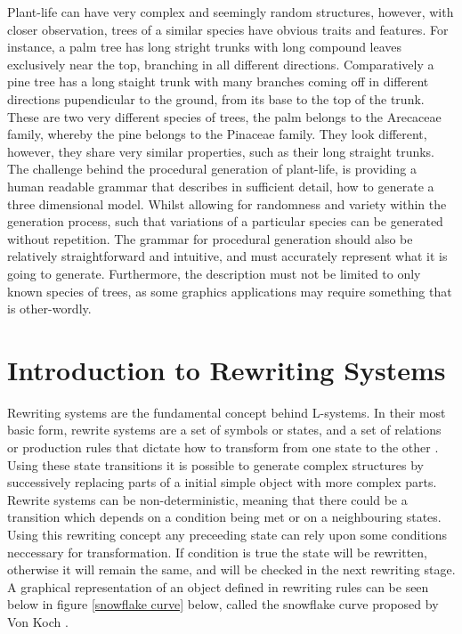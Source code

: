 Plant-life can have very complex and seemingly random structures, however, with closer observation, trees of a similar species have obvious traits and features. For instance, a palm tree has long stright trunks with long compound leaves exclusively near the top, branching in all different directions. Comparatively a pine tree has a long staight trunk with many branches coming off in different directions pupendicular to the ground, from its base to the top of the trunk. These are two very different species of trees, the palm  belongs to the Arecaceae family, whereby the pine belongs to the Pinaceae family. They look different, however, they share very similar properties, such as their long straight trunks. The challenge behind the  procedural generation of plant-life, is providing a human readable grammar that describes in sufficient detail, how to generate a three dimensional model. Whilst allowing for randomness and variety within the generation process, such that variations of a particular species can be generated without repetition. The  grammar for procedural generation should also be relatively straightforward and intuitive, and must accurately represent what it is going to generate. Furthermore, the description must not be limited to only known species of trees, as some graphics applications may require something that is other-wordly.

\section{Introduction to Rewriting Systems}

Rewriting systems are the fundamental concept behind L-systems. In their most basic form, rewrite systems are a set of symbols or states, and a set of relations or production rules that dictate how to transform from one state to the other \cite{prusinkiewicz2012algorithmic}. Using these state transitions it is possible to generate complex structures by successively replacing parts of a initial simple object with more complex parts. Rewrite systems can be non-deterministic, meaning that there could be a transition which depends on a condition being met or on a neighbouring states. Using this rewriting concept any preceeding state can rely upon some conditions neccessary for transformation. If condition is true the state will be rewritten, otherwise it will remain the same, and will be checked in the next rewriting stage. A graphical representation of an object defined in rewriting rules can be seen below in figure \ref{snowflake curve} below, called the snowflake curve proposed by Von Koch \cite{koch1906methode}.

